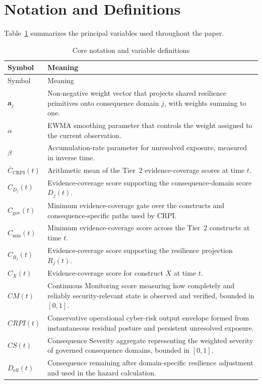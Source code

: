 \documentclass[11pt]{article}
\begin{document}
\appendix
\section{Notation and Definitions}
Table~\ref{tab:notation} summarizes the principal variables used throughout the paper.

\begin{longtable}{p{} p{}}
  \caption{Core notation and variable definitions}
  \label{tab:notation}\\
  \toprule
  Symbol & Meaning \\
  \midrule
  \endfirsthead
  \toprule
  Symbol & Meaning \\
  \midrule
  \endhead
  $\mathbf{a}_j$ & Non-negative weight vector that projects shared resilience primitives onto consequence domain $j$, with weights summing to one. \\
  $\alpha$ & EWMA smoothing parameter that controls the weight assigned to the current observation. \\
  $\beta$ & Accumulation-rate parameter for unresolved exposure, measured in inverse time. \\
  $\bar C_{\mathrm{CRPI}}(t)$ & Arithmetic mean of the Tier~2 evidence-coverage scores at time $t$. \\
  $C_{D_j}(t)$ & Evidence-coverage score supporting the consequence-domain score $D_j(t)$. \\
  $C_{\mathrm{gov}}(t)$ & Minimum evidence-coverage gate over the constructs and consequence-specific paths used by CRPI. \\
  $C_{\min}(t)$ & Minimum evidence-coverage score across the Tier~2 constructs at time $t$. \\
  $C_{R_j}(t)$ & Evidence-coverage score supporting the resilience projection $R_j(t)$. \\
  $C_X(t)$ & Evidence-coverage score for construct $X$ at time $t$. \\
  $CM(t)$ & Continuous Monitoring score measuring how completely and reliably security-relevant state is observed and verified, bounded in $[0,1]$. \\
  $CRPI(t)$ & Conservative operational cyber-risk output envelope formed from instantaneous residual posture and persistent unresolved exposure. \\
  $CS(t)$ & Consequence Severity aggregate representing the weighted severity of governed consequence domains, bounded in $[0,1]$. \\
  $D_{\mathrm{eff}}(t)$ & Consequence remaining after domain-specific resilience adjustment and used in the hazard calculation. \\

\end{longtable}
\end{document}
